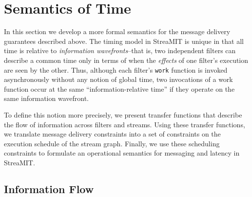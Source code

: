 \section{Semantics of Time}
\label{sec:time}
In this section we develop a more formal semantics for the message
delivery guarantees described above.  The timing model in StreaMIT is
unique in that all time is relative to {\it information
wavefronts}--that is, two independent filters can describe a common
time only in terms of when the {\it effects} of one filter's execution
are seen by the other.  Thus, although each filter's {\tt work}
function is invoked asynchronously without any notion of global time,
two invocations of a work function occur at the same
``information-relative time'' if they operate on the same information
wavefront.

To define this notion more precisely, we present transfer functions
that describe the flow of information across filters and streams.
Using these transfer functions, we translate message delivery
constraints into a set of constraints on the execution schedule of the
stream graph.  Finally, we use these scheduling constraints to
formulate an operational semantics for messaging and latency in
StreaMIT.

\subsection{Information Flow}

